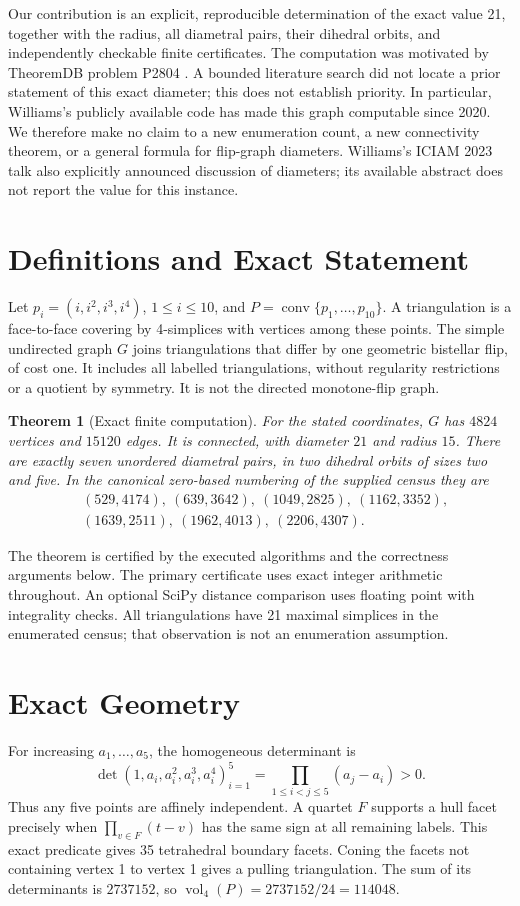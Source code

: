 \documentclass[11pt]{article}
\newtheorem{theorem}{Theorem}
\newcommand{\conv}{\operatorname{conv}}
\begin{document}
Our contribution is an explicit, reproducible determination of the exact
value 21, together with the radius, all diametral pairs, their dihedral
orbits, and independently checkable finite certificates. The computation was
motivated by TheoremDB problem P2804 \cite{theoremdb}. A bounded literature
search did not locate a prior statement of this exact diameter; this does not
establish priority. In particular, Williams's publicly available code
\cite{williamscode} has made this graph computable since 2020. We therefore
make no claim to a new enumeration count, a new connectivity theorem, or a
general formula for flip-graph diameters. Williams's ICIAM 2023 talk
\cite{williamsiciam} also explicitly announced discussion of diameters; its
available abstract does not report the value for this instance.

\section{Definitions and Exact Statement}
Let $p_i=(i,i^2,i^3,i^4)$, $1\leq i\leq10$, and
$P=\conv\{p_1,\ldots,p_{10}\}$. A triangulation is a face-to-face covering by
4-simplices with vertices among these points. The simple undirected graph $G$
joins triangulations that differ by one geometric bistellar flip, of cost one.
It includes all labelled triangulations, without regularity restrictions or a
quotient by symmetry. It is not the directed monotone-flip graph.

\begin{theorem}[Exact finite computation]
For the stated coordinates, $G$ has $4824$ vertices and $15120$ edges. It is
connected, with diameter $21$ and radius $15$. There are exactly seven unordered
diametral pairs, in two dihedral orbits of sizes two and five. In the canonical zero-based numbering of the supplied census
they are
\[
\begin{split}
&(529,4174),\ (639,3642),\ (1049,2825),\ (1162,3352),\\
&(1639,2511),\ (1962,4013),\ (2206,4307).
\end{split}
\]
\end{theorem}
The theorem is certified by the executed algorithms and the correctness
arguments below. The primary certificate uses exact integer arithmetic throughout. An optional
SciPy distance comparison uses floating point with integrality checks. All triangulations have 21 maximal
simplices in the enumerated census; that observation is not an enumeration
assumption.

\section{Exact Geometry}
For increasing $a_1,\ldots,a_5$, the homogeneous determinant is
\[
\det(1,a_i,a_i^2,a_i^3,a_i^4)_{i=1}^{5}
=\prod_{1\leq i<j\leq5}(a_j-a_i)>0.
\]
Thus any five points are affinely independent. A quartet $F$ supports a hull
facet precisely when $\prod_{v\in F}(t-v)$ has the same sign at all remaining
labels. This exact predicate gives 35 tetrahedral boundary facets. Coning the
facets not containing vertex 1 to vertex 1 gives a pulling triangulation.
The sum of its determinants is $2737152$, so
$\operatorname{vol}_4(P)=2737152/24=114048$.
\end{document}
